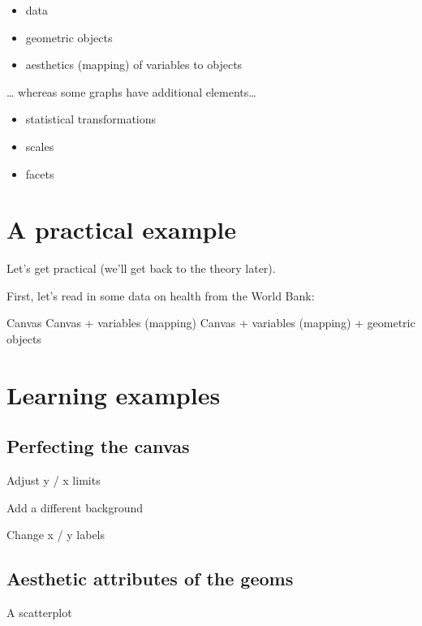 \documentclass[
]{book}
\providecommand{\tightlist}{%
  \setlength{\itemsep}{0pt}\setlength{\parskip}{0pt}}
\begin{document}
\begin{itemize}
\tightlist
\item
  data
\item
  geometric objects
\item
  aesthetics (mapping) of variables to objects
\end{itemize}

\ldots{} whereas some graphs have additional elements\ldots{}

\begin{itemize}
\tightlist
\item
  statistical transformations
\item
  scales
\item
  facets
\end{itemize}

\hypertarget{a-practical-example}{%
\section{A practical example}\label{a-practical-example}}

Let's get practical (we'll get back to the theory later).

First, let's read in some data on health from the World Bank:

Canvas
Canvas + variables (mapping)
Canvas + variables (mapping) + geometric objects

\hypertarget{learning-examples}{%
\section{Learning examples}\label{learning-examples}}

\hypertarget{perfecting-the-canvas}{%
\subsection{Perfecting the canvas}\label{perfecting-the-canvas}}

Adjust y / x limits

Add a different background

Change x / y labels

\hypertarget{aesthetic-attributes-of-the-geoms}{%
\subsection{Aesthetic attributes of the geoms}\label{aesthetic-attributes-of-the-geoms}}

A scatterplot
\end{document}
